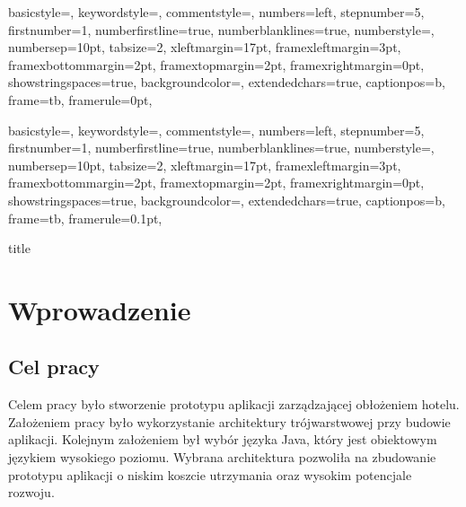 \documentclass[a4paper,onecolumn,oneside,11pt,wide,floatssmall]{mwrep}
\theoremstyle{definition}
\theoremstyle{plain}%
\theoremstyle{remark}
\begin{document}
{
basicstyle={\footnotesize},
keywordstyle={\bf\footnotesize\color{blue}},
commentstyle={\em\footnotesize\color{magenta}},
numbers=left,
stepnumber=5,
firstnumber=1,
numberfirstline=true,
numberblanklines=true,
numberstyle={\sf\tiny},
numbersep=10pt,
tabsize=2,
xleftmargin=17pt,
framexleftmargin=3pt,
framexbottommargin=2pt,
framextopmargin=2pt,
framexrightmargin=0pt,
showstringspaces=true,
backgroundcolor={\color{ListingBackground}},
extendedchars=true,
captionpos=b,
frame=tb,
framerule=0pt,
}

{
basicstyle={\footnotesize},
keywordstyle={\bf\footnotesize\color{blue}},
commentstyle={\em\footnotesize\color{magenta}},
numbers=left,
stepnumber=5,
firstnumber=1,
numberfirstline=true,
numberblanklines=true,
numberstyle={\sf\tiny},
numbersep=10pt,
tabsize=2,
xleftmargin=17pt,
framexleftmargin=3pt,
framexbottommargin=2pt,
framextopmargin=2pt,
framexrightmargin=0pt,
showstringspaces=true,
backgroundcolor={\color{ListingBackground}},
extendedchars=true,
captionpos=b,
frame=tb,
framerule=0.1pt,
}

\renewcommand*\lstlistingname{Wydruk}
\renewcommand*\lstlistlistingname{Spis wydruków}

\renewcommand{\baselinestretch}{1.0}
\raggedbottom
 {title}

\tableofcontents


\newpage
{}
\setcounter{page}{1}


\chapter{Wprowadzenie}

\section{Cel pracy}
Celem pracy było stworzenie prototypu aplikacji zarządzającej obłożeniem hotelu. Założeniem pracy było wykorzystanie architektury trójwarstwowej przy budowie aplikacji. Kolejnym założeniem był wybór języka Java, który jest obiektowym językiem wysokiego poziomu. Wybrana architektura pozwoliła na zbudowanie prototypu aplikacji o niskim koszcie utrzymania oraz wysokim potencjale rozwoju.
\end{document}
